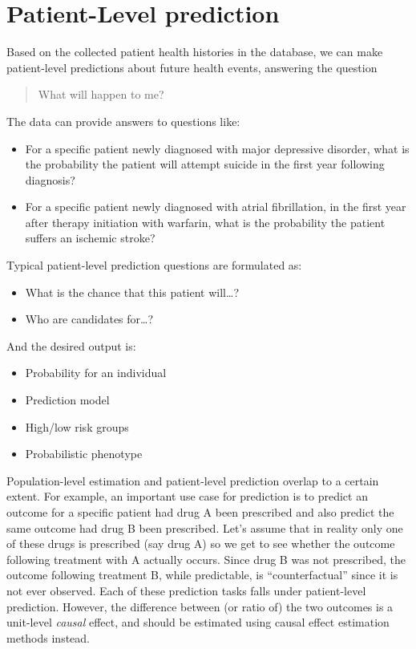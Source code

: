 \documentclass[11pt]{book}
\providecommand{\tightlist}{%
  \setlength{\itemsep}{0pt}\setlength{\parskip}{0pt}}
\theoremstyle{definition}
\theoremstyle{definition}
\theoremstyle{definition}
\theoremstyle{remark}
\begin{document}
\hypertarget{patient-level-prediction}{%
\section{Patient-Level prediction}\label{patient-level-prediction}}

Based on the collected patient health histories in the database, we can make patient-level predictions about future health events, answering the question

\begin{quote}
What will happen to me?
\end{quote}

The data can provide answers to questions like:

\begin{itemize}
\tightlist
\item
  For a specific patient newly diagnosed with major depressive disorder, what is the probability the patient will attempt suicide in the first year following diagnosis?
\item
  For a specific patient newly diagnosed with atrial fibrillation, in the first year after therapy initiation with warfarin, what is the probability the patient suffers an ischemic stroke?
\end{itemize}

Typical patient-level prediction questions are formulated as:

\begin{itemize}
\tightlist
\item
  What is the chance that this patient will\ldots?
\item
  Who are candidates for\ldots?
\end{itemize}

And the desired output is:

\begin{itemize}
\tightlist
\item
  Probability for an individual
\item
  Prediction model
\item
  High/low risk groups
\item
  Probabilistic phenotype
\end{itemize}

Population-level estimation and patient-level prediction overlap to a certain extent. For example, an important use case for prediction is to predict an outcome for a specific patient had drug A been prescribed and also predict the same outcome had drug B been prescribed. Let's assume that in reality only one of these drugs is prescribed (say drug A) so we get to see whether the outcome following treatment with A actually occurs. Since drug B was not prescribed, the outcome following treatment B, while predictable, is ``counterfactual'' since it is not ever observed. Each of these prediction tasks falls under patient-level prediction. However, the difference between (or ratio of) the two outcomes is a unit-level \emph{causal} effect, and should be estimated using causal effect estimation methods instead.
\end{document}
